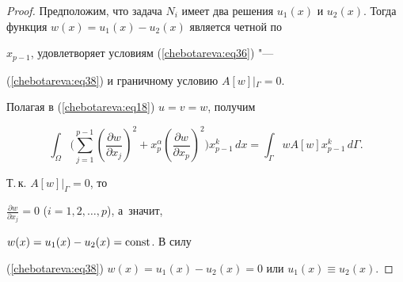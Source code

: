 \begin{proof}


Предположим,  что задача $N_i $ имеет два решения $u_1 (x)$ и $u_2


(x)$. Тогда функция $w(x) = u_1 (x) - u_2 (x)$ является четной по


$x_{p - 1} $,  удовлетворяет условиям (\ref{chebotareva:eq36}) "---


(\ref{chebotareva:eq38}) и граничному условию $A\left[ w


\right]\left| {_\Gamma = 0} \right.$.





Полагая в (\ref{chebotareva:eq18}) $u = v = w$,  получим


\[


\int_\Omega \Biggl( \sum\limits_{j = 1}^{p - 1} \left(


\frac{\partial w}{\partial x_j } \right)^2 + x_p^\alpha \left(


\frac{\partial w}{\partial x_p } \right)^2  \Biggr)x_{p - 1}^k\,


dx = \int_\Gamma wA\left[ w \right] x_{p - 1}^k \,d\Gamma. 


\]


Т.\,к. $A\left[ w \right]\big|_\Gamma = 0$,  то


$\frac{\partial w}{\partial x_j } = 0$  ($i = 1, 2, \dots,  p$),  а~значит,


$w(x) = u_1 (x) - u_2 (x) = \rm const$. В силу


(\ref{chebotareva:eq38}) $w(x) = u_1 (x) - u_2 (x) = 0$ или $u_1


(x) \equiv u_2 (x)$.


\end{proof}





